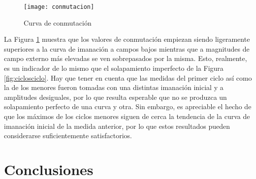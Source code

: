 \documentclass[fleqn,11pt]{SelfArx} %
\begin{document}
\begin{figure}[ht!]\centering
	\texttt{[image: conmutacion]}
	\caption{Curva de conmutación}
	\label{fig:conmutación}
\end{figure}

La Figura \ref{fig:conmutación} muestra que los valores de conmutación empiezan siendo ligeramente superiores a la curva de imanación a campos bajos mientras que a magnitudes de campo externo más elevadas se ven sobrepasados por la misma. Esto, realmente, es un indicador de lo mismo que el solapamiento imperfecto de la Figura \ref{fig:ciclosciclo}. Hay que tener en cuenta que las medidas del primer ciclo así como la de los menores fueron tomadas con una distintas imanación inicial y a amplitudes desiguales, por lo que resulta esperable que no se produzca un solapamiento perfecto de una curva y otra. Sin embargo, es apreciable el hecho de que los máximos de los ciclos menores siguen de cerca la tendencia de la curva de imanación inicial de la medida anterior, por lo que estos resultados pueden considerarse suficientemente satisfactorios. 

\section{Conclusiones}







\end{document}
